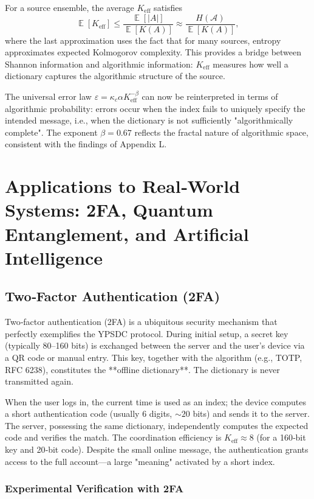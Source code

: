 \documentclass[12pt,a4paper]{article}
\theoremstyle{remark}
\newcommand{\Keff}{K_{\mathrm{eff}}}
\DeclareMathOperator{\E}{\mathbb{E}}
\begin{document}
	For a source ensemble, the average $\Keff$ satisfies
	\begin{equation}
		\E[\Keff] \le \frac{\E[|A|]}{\E[K(A)]} \approx \frac{H(\mathcal{A})}{\E[K(A)]},
	\end{equation}
	where the last approximation uses the fact that for many sources, entropy approximates expected Kolmogorov complexity. This provides a bridge between Shannon information and algorithmic information: $\Keff$ measures how well a dictionary captures the algorithmic structure of the source.
	
	The universal error law $\varepsilon = \kappa_c \alpha \Keff^{-\beta}$ can now be reinterpreted in terms of algorithmic probability: errors occur when the index fails to uniquely specify the intended message, i.e., when the dictionary is not sufficiently "algorithmically complete". The exponent $\beta = 0.67$ reflects the fractal nature of algorithmic space, consistent with the findings of Appendix L.
	
	\section{Applications to Real‑World Systems: 2FA, Quantum Entanglement, and Artificial Intelligence}
	\label{sec:applications}
	
	\subsection{Two‑Factor Authentication (2FA)}
	
	Two‑factor authentication (2FA) is a ubiquitous security mechanism that perfectly exemplifies the YPSDC protocol. During initial setup, a secret key (typically 80–160 bits) is exchanged between the server and the user's device via a QR code or manual entry. This key, together with the algorithm (e.g., TOTP, RFC 6238), constitutes the **offline dictionary**. The dictionary is never transmitted again.
	
	When the user logs in, the current time is used as an index; the device computes a short authentication code (usually 6 digits, $\sim 20$ bits) and sends it to the server. The server, possessing the same dictionary, independently computes the expected code and verifies the match. The coordination efficiency is $\Keff \approx 8$ (for a 160‑bit key and 20‑bit code). Despite the small online message, the authentication grants access to the full account—a large "meaning" activated by a short index.
	
	\subsubsection{Experimental Verification with 2FA}
	\label{subsec:2fa-experiment}
	
\end{document}
